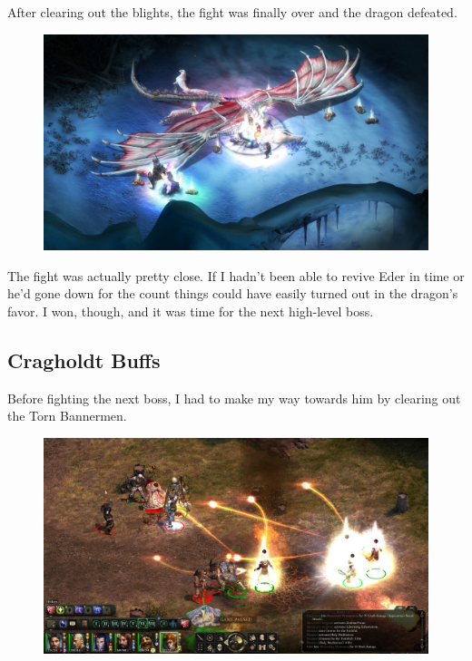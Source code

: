 \documentclass{article}
\begin{document}
After clearing out the blights, the fight was finally over and the dragon defeated.

\begin{figure}
\includegraphics[scale=0.33]{files/blog/2019_08_17_poe_potd_wmpt1/2019_08_17_alpine_dragon_7.jpg}
\end{figure}

The fight was actually pretty close.  If I hadn't been able to revive Eder in time or he'd gone down for the count things could have easily turned out in the dragon's favor.  I won, though, and it was time for the next high-level boss.

\subsection{Cragholdt Buffs}
Before fighting the next boss, I had to make my way towards him by clearing out the Torn Bannermen.

\begin{figure}
\includegraphics[scale=0.33]{files/blog/2019_08_17_poe_potd_wmpt1/2019_08_17_cragholdt_bluffs_1.jpg}
\end{figure}
\end{document}
